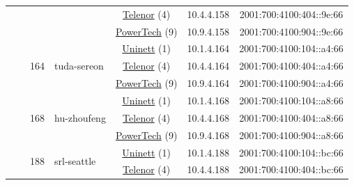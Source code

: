\begin{small}
\begin{center}
\begin{longtable}{|c|c|c|c|c|c|c|c|}
  &  &  &  & \multicolumn{2}{|c|}{\tiny{\href{https://www.telenor.no}{Telenor} (4)}} & \tiny{10.4.4.158} & \tiny{2001:700:4100:404::9e:66} \\* \cline{5-5}\cline{6-6}\cline{7-7}\cline{8-8}
  &  &  &  & \multicolumn{2}{|c|}{\tiny{\href{http://www.powertech.no}{PowerTech} (9)}} & \tiny{10.9.4.158} & \tiny{2001:700:4100:904::9e:66} \\* \cline{3-3}\cline{4-4}\cline{5-5}\cline{6-6}\cline{7-7}\cline{8-8}
  &  & \multirow{3}{*}{\tiny{164}} & \multicolumn{1}{|l|}{\multirow{3}{*}{\tiny{tuda-sereon}}} & \multicolumn{2}{|c|}{\tiny{\href{https://www.uninett.no}{Uninett} (1)}} & \tiny{10.1.4.164} & \tiny{2001:700:4100:104::a4:66} \\* \cline{5-5}\cline{6-6}\cline{7-7}\cline{8-8}
  &  &  &  & \multicolumn{2}{|c|}{\tiny{\href{https://www.telenor.no}{Telenor} (4)}} & \tiny{10.4.4.164} & \tiny{2001:700:4100:404::a4:66} \\* \cline{5-5}\cline{6-6}\cline{7-7}\cline{8-8}
  &  &  &  & \multicolumn{2}{|c|}{\tiny{\href{http://www.powertech.no}{PowerTech} (9)}} & \tiny{10.9.4.164} & \tiny{2001:700:4100:904::a4:66} \\* \cline{3-3}\cline{4-4}\cline{5-5}\cline{6-6}\cline{7-7}\cline{8-8}
  &  & \multirow{3}{*}{\tiny{168}} & \multicolumn{1}{|l|}{\multirow{3}{*}{\tiny{hu-zhoufeng}}} & \multicolumn{2}{|c|}{\tiny{\href{https://www.uninett.no}{Uninett} (1)}} & \tiny{10.1.4.168} & \tiny{2001:700:4100:104::a8:66} \\* \cline{5-5}\cline{6-6}\cline{7-7}\cline{8-8}
  &  &  &  & \multicolumn{2}{|c|}{\tiny{\href{https://www.telenor.no}{Telenor} (4)}} & \tiny{10.4.4.168} & \tiny{2001:700:4100:404::a8:66} \\* \cline{5-5}\cline{6-6}\cline{7-7}\cline{8-8}
  &  &  &  & \multicolumn{2}{|c|}{\tiny{\href{http://www.powertech.no}{PowerTech} (9)}} & \tiny{10.9.4.168} & \tiny{2001:700:4100:904::a8:66} \\* \cline{3-3}\cline{4-4}\cline{5-5}\cline{6-6}\cline{7-7}\cline{8-8}
  &  & \multirow{3}{*}{\tiny{188}} & \multicolumn{1}{|l|}{\multirow{3}{*}{\tiny{srl-seattle}}} & \multicolumn{2}{|c|}{\tiny{\href{https://www.uninett.no}{Uninett} (1)}} & \tiny{10.1.4.188} & \tiny{2001:700:4100:104::bc:66} \\* \cline{5-5}\cline{6-6}\cline{7-7}\cline{8-8}
  &  &  &  & \multicolumn{2}{|c|}{\tiny{\href{https://www.telenor.no}{Telenor} (4)}} & \tiny{10.4.4.188} & \tiny{2001:700:4100:404::bc:66} \\* \cline{5-5}\cline{6-6}\cline{7-7}\cline{8-8}

\end{longtable}
\end{center}
\end{small}
